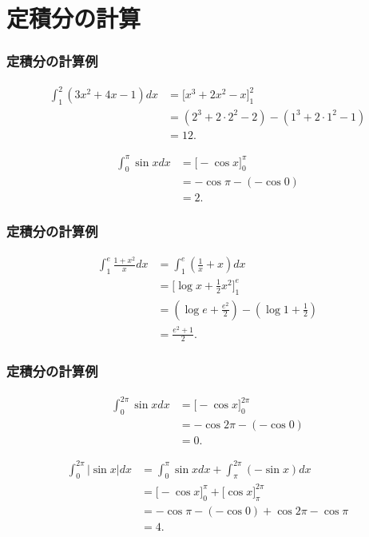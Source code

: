 \documentclass[dvipdfmx,cjk,10.2pt]{beamer}
\theoremstyle{definition}
\begin{document}
\section{定積分の計算}

\begin{frame}
\frametitle{定積分の計算例}

\begin{align*}
\int_1^2(3x^2+4x-1)dx & = \big[x^3+2x^2-x\big]_1^2 \\
& = (2^3+2\cdot 2^2-2)-(1^3+2\cdot 1^2-1) \\
& = 12. 
\end{align*}


\begin{align*}
\int_0^\pi \sin x dx & = \big[ -\cos x\big]_0^\pi \\
& = -\cos \pi - (- \cos 0) \\
& = 2. 
\end{align*}

\end{frame}




\begin{frame}
\frametitle{定積分の計算例}

\begin{align*}
\int_1^e\frac{1+x^2}{x}dx & = \int_1^e(\frac{1}{x}+x)dx \\
& = \big[ \log x + \frac{1}{2}x^2\big]_1^e \\
& = (\log e + \frac{e^2}{2})-(\log 1 +\frac{1}{2})\\
& = \frac{e^2+1}{2}. 
\end{align*}


\end{frame}




\begin{frame}
\frametitle{定積分の計算例}


\begin{align*}
\int_0^{2\pi} \sin x dx & = \big[ -\cos x\big]_0^{2\pi} \\
& = -\cos 2\pi - (- \cos 0) \\
& =0. 
\end{align*}

\begin{align*}
\int_0^{2\pi} |\sin x| dx & = \int_0^{\pi} \sin x dx + \int_\pi^{2\pi} (-\sin x) dx \\
& = \big[ -\cos x\big]_0^{\pi} +  \big[ \cos x\big]_\pi^{2\pi} \\
& = -\cos \pi - (- \cos 0) + \cos 2\pi - \cos \pi \\
& =4. 
\end{align*}

\end{frame}
\end{document}
